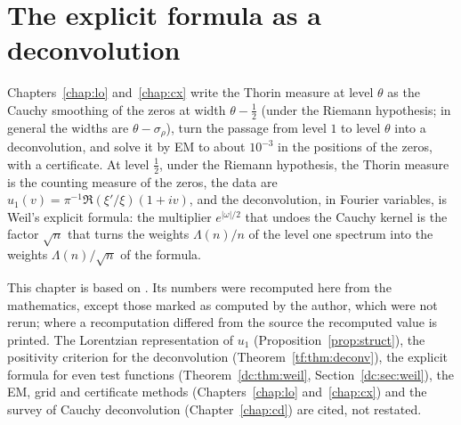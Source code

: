 \chapter{The explicit formula as a deconvolution}\label{chap:es}

Chapters~\ref{chap:lo} and~\ref{chap:cx} write the Thorin measure at level $\theta$ as the Cauchy smoothing of the zeros at width $\theta-\tfrac12$ (under the Riemann hypothesis; in general the widths are $\theta-\sigma_\rho$), turn the passage from level $1$ to level $\theta$ into a deconvolution, and solve it by EM to about $10^{-3}$ in the positions of the zeros, with a certificate. At level $\tfrac12$, under the Riemann hypothesis, the Thorin measure is the counting measure of the zeros, the data are $u_1(v)=\pi^{-1}\Re(\xi'/\xi)(1+iv)$, and the deconvolution, in Fourier variables, is Weil's explicit formula: the multiplier $e^{|\omega|/2}$ that undoes the Cauchy kernel is the factor $\sqrt n$ that turns the weights $\Lambda(n)/n$ of the level one spectrum into the weights $\Lambda(n)/\sqrt n$ of the formula.

This chapter is based on \cite{P26es}. Its numbers were recomputed here from the mathematics, except those marked as computed by the author, which were not rerun; where a recomputation differed from the source the recomputed value is printed. The Lorentzian representation of $u_1$ (Proposition~\ref{prop:struct}), the positivity criterion for the deconvolution (Theorem~\ref{tf:thm:deconv}), the explicit formula for even test functions (Theorem~\ref{dc:thm:weil}, Section~\ref{dc:sec:weil}), the EM, grid and certificate methods (Chapters~\ref{chap:lo} and~\ref{chap:cx}) and the survey of Cauchy deconvolution (Chapter~\ref{chap:cd}) are cited, not restated.

